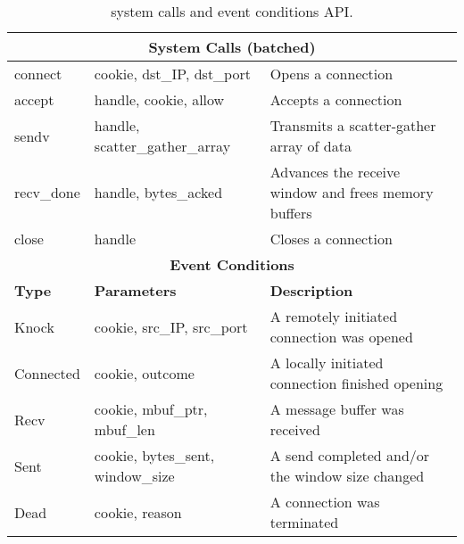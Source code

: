 \begin{table*}[t]
\centering
\begin{small}
\begin{tabular}{|l|l|l|}
\hline
\multicolumn{3}{|c|}{{\bf System Calls (batched)}} \\
\hline
connect &             cookie, dst\_IP, dst\_port		& Opens a connection\\
accept &              handle, cookie, allow			& Accepts a connection\\
sendv &               handle, scatter\_gather\_array		& Transmits a scatter-gather array of data\\
recv\_done &          handle, bytes\_acked			& Advances the receive window and frees memory buffers\\
close &               handle					& Closes a connection\\
\hline  \hline
\multicolumn{3}{|c|}{{\bf Event Conditions}} \\
\hline
{\bf Type} &           {\bf Parameters}  &
{\bf Description}\\
Knock  &               cookie, src\_IP, src\_port		& A remotely initiated connection was opened \\
Connected &            cookie, outcome				& A locally initiated connection finished opening \\
Recv &                 cookie, mbuf\_ptr, mbuf\_len		& A message buffer was received \\
Sent &                 cookie, bytes\_sent, window\_size	& A send completed and/or the window size changed \\
Dead &                 cookie, reason				& A connection was terminated \\
\hline
\end{tabular}
\caption{\ix system calls and event conditions API. 
}
\label{tbl:api}
\end{small}
\end{table*}

